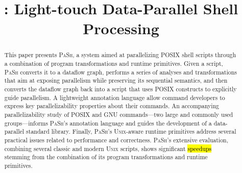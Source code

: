 \documentclass[sigplan, review, screen, anonymous]{acmart}
\title{\sys: Light-touch Data-Parallel Shell Processing}         %
\newcommand{\todo}[1]{\hl{#1}\xspace}
\newcommand{\kk}[1]{[{\color{magenta}kk: #1}]}
\newcommand{\sys}{{\scshape PaSh}\xspace}
\newcommand{\unix}{{\scshape Unix}\xspace}
\begin{document}




\begin{abstract}
This paper presents \sys, a system aimed at parallelizing POSIX shell scripts through a combination of program transformations and runtime primitives.
Given a script, \sys converts it to a dataflow graph, performs a series of analyses and transformations that aim at exposing parallelism while preserving its sequential semantics, and then converts the dataflow graph back into a script that uses POSIX constructs to explicitly guide parallelism.
A lightweight annotation language allow command developers to express key parallelizability properties about their commands.
An accompanying parallelizability study of POSIX and GNU commands---two large and commonly used groups---informs \sys's annotation language and guides the development of a data-parallel standard library.
Finally, \sys's \unix-aware runtime primitives address several practical issues related to performance and correctness.
\sys's extensive evaluation, combining several classic and modern \unix scripts, shows significant \todo{speedups} stemming from the combination of its program transformations and runtime primitives.
\end{abstract}
\end{document}
